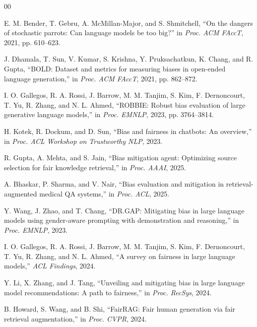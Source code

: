 \documentclass[conference]{IEEEtran}
\begin{document}
\begin{thebibliography}{00}

E. M. Bender, T. Gebru, A. McMillan-Major, and S. Shmitchell,
``On the dangers of stochastic parrots: Can language models be too big?''
in \textit{Proc. ACM FAccT}, 2021, pp. 610--623.

J. Dhamala, T. Sun, V. Kumar, S. Krishna, Y. Pruksachatkun, K. Chang, and R. Gupta,
``BOLD: Dataset and metrics for measuring biases in open-ended language generation,''
in \textit{Proc. ACM FAccT}, 2021, pp. 862--872.

I. O. Gallegos, R. A. Rossi, J. Barrow, M. M. Tanjim, S. Kim, F. Dernoncourt, T. Yu, R. Zhang, and N. L. Ahmed,
``ROBBIE: Robust bias evaluation of large generative language models,''
in \textit{Proc. EMNLP}, 2023, pp. 3764--3814.

H. Kotek, R. Dockum, and D. Sun,
``Bias and fairness in chatbots: An overview,''
in \textit{Proc. ACL Workshop on Trustworthy NLP}, 2023.

R. Gupta, A. Mehta, and S. Jain,
``Bias mitigation agent: Optimizing source selection for fair knowledge retrieval,''
in \textit{Proc. AAAI}, 2025.

A. Bhaskar, P. Sharma, and V. Nair,
``Bias evaluation and mitigation in retrieval-augmented medical QA systems,''
in \textit{Proc. ACL}, 2025.

Y. Wang, J. Zhao, and T. Chang,
``DR.GAP: Mitigating bias in large language models using gender-aware prompting with demonstration and reasoning,''
in \textit{Proc. EMNLP}, 2023.

I. O. Gallegos, R. A. Rossi, J. Barrow, M. M. Tanjim, S. Kim, F. Dernoncourt, T. Yu, R. Zhang, and N. L. Ahmed,
``A survey on fairness in large language models,''
\textit{ACL Findings}, 2024.

Y. Li, X. Zhang, and J. Tang,
``Unveiling and mitigating bias in large language model recommendations: A path to fairness,''
in \textit{Proc. RecSys}, 2024.

B. Howard, S. Wang, and B. Shi,
``FairRAG: Fair human generation via fair retrieval augmentation,''
in \textit{Proc. CVPR}, 2024.

\end{thebibliography}
\end{document}

